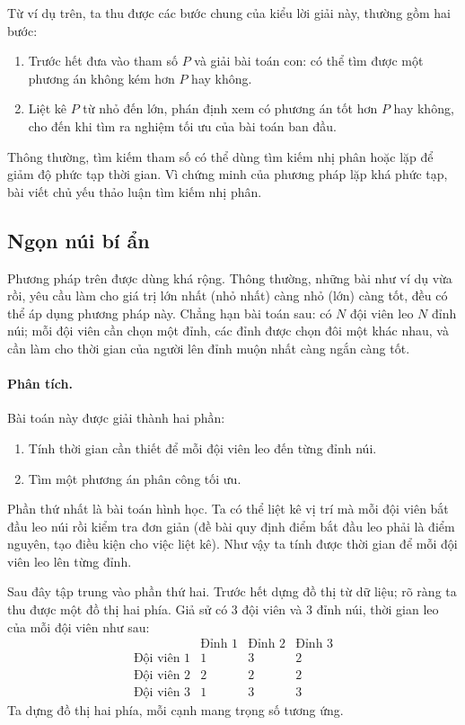 \documentclass[11pt]{article}
\begin{document}
Từ ví dụ trên, ta thu được các bước chung của kiểu lời giải này, thường gồm
hai bước:
\begin{enumerate}[label=\Roman*.]
  \item Trước hết đưa vào tham số $P$ và giải bài toán con: có thể tìm được
  một phương án không kém hơn $P$ hay không.
  \item Liệt kê $P$ từ nhỏ đến lớn, phán định xem có phương án tốt hơn $P$ hay
  không, cho đến khi tìm ra nghiệm tối ưu của bài toán ban đầu.
\end{enumerate}

Thông thường, tìm kiếm tham số có thể dùng tìm kiếm nhị phân hoặc lặp để giảm
độ phức tạp thời gian. Vì chứng minh của phương pháp lặp khá phức tạp, bài
viết chủ yếu thảo luận tìm kiếm nhị phân.

\subsection{Ngọn núi bí ẩn}

Phương pháp trên được dùng khá rộng. Thông thường, những bài như ví dụ vừa
rồi, yêu cầu làm cho giá trị lớn nhất (nhỏ nhất) càng nhỏ (lớn) càng tốt, đều
có thể áp dụng phương pháp này. Chẳng hạn bài toán sau: có $N$ đội viên leo
$N$ đỉnh núi; mỗi đội viên cần chọn một đỉnh, các đỉnh được chọn đôi một khác
nhau, và cần làm cho thời gian của người lên đỉnh muộn nhất càng ngắn càng
tốt.

\paragraph{Phân tích.}
Bài toán này được giải thành hai phần:
\begin{enumerate}
  \item Tính thời gian cần thiết để mỗi đội viên leo đến từng đỉnh núi.
  \item Tìm một phương án phân công tối ưu.
\end{enumerate}

Phần thứ nhất là bài toán hình học. Ta có thể liệt kê vị trí mà mỗi đội viên
bắt đầu leo núi rồi kiểm tra đơn giản (đề bài quy định điểm bắt đầu leo phải
là điểm nguyên, tạo điều kiện cho việc liệt kê). Như vậy ta tính được thời
gian để mỗi đội viên leo lên từng đỉnh.

Sau đây tập trung vào phần thứ hai. Trước hết dựng đồ thị từ dữ liệu; rõ ràng
ta thu được một đồ thị hai phía. Giả sử có $3$ đội viên và $3$ đỉnh núi, thời
gian leo của mỗi đội viên như sau:
\[
\begin{array}{c|ccc}
 & \text{Đỉnh }1 & \text{Đỉnh }2 & \text{Đỉnh }3\\ \hline
\text{Đội viên }1 & 1 & 3 & 2\\
\text{Đội viên }2 & 2 & 2 & 2\\
\text{Đội viên }3 & 1 & 3 & 3
\end{array}
\]
Ta dựng đồ thị hai phía, mỗi cạnh mang trọng số tương ứng.
\end{document}
